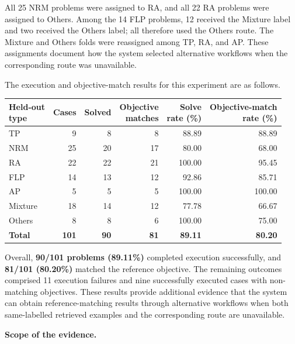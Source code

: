 \documentclass[11pt]{article}
\begin{document}
\begin{enumerate}[label=(AssoE.\arabic*),leftmargin=*]
\begin{enumerate}[label=(R1.Major.\arabic*),leftmargin=*]
All 25 NRM problems were assigned to RA, and all 22 RA problems were assigned to Others. Among the 14 FLP problems, 12 received the Mixture label and two received the Others label; all therefore used the Others route. The Mixture and Others folds were reassigned among TP, RA, and AP. These assignments document how the system selected alternative workflows when the corresponding route was unavailable.

The execution and objective-match results for this experiment are as follows.

\begin{center}
\small
\setlength{\tabcolsep}{5pt}
\renewcommand{\arraystretch}{1.12}
\begin{tabular}{lrrrrr}
\hline
\shortstack[l]{Held-out\\type}
& Cases
& Solved
& \shortstack{Objective\\matches}
& \shortstack{Solve\\rate (\%)}
& \shortstack{Objective-match\\rate (\%)} \\
\hline
TP      & 9  & 8  & 8  & 88.89  & 88.89 \\
NRM     & 25 & 20 & 17 & 80.00  & 68.00 \\
RA      & 22 & 22 & 21 & 100.00 & 95.45 \\
FLP     & 14 & 13 & 12 & 92.86  & 85.71 \\
AP      & 5  & 5  & 5  & 100.00 & 100.00 \\
Mixture & 18 & 14 & 12 & 77.78  & 66.67 \\
Others  & 8  & 8  & 6  & 100.00 & 75.00 \\
\hline
\textbf{Total}
& \textbf{101}
& \textbf{90}
& \textbf{81}
& \textbf{89.11}
& \textbf{80.20} \\
\hline
\end{tabular}
\end{center}

Overall, \textbf{90/101 problems (89.11\%)} completed execution successfully, and \textbf{81/101 (80.20\%)} matched the reference objective. The remaining outcomes comprised 11 execution failures and nine successfully executed cases with non-matching objectives. These results provide additional evidence that the system can obtain reference-matching results through alternative workflows when both same-labelled retrieved examples and the corresponding route are unavailable.

\medskip
\noindent\textbf{Scope of the evidence.}


\end{enumerate}
\end{enumerate}
\end{document}
